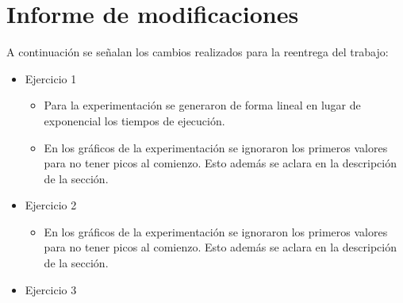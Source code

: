 \section*{Informe de modificaciones}

A continuación se señalan los cambios realizados para la reentrega del trabajo:

\begin{itemize}
	\item{
		Ejercicio 1
		\begin{itemize}
			\item Para la experimentación se generaron de forma lineal en lugar
			de exponencial los tiempos de ejecución.
			\item En los gráficos de la experimentación se ignoraron los primeros
			valores para no tener picos al comienzo. Esto además se aclara en la
			descripción de la sección.
		\end{itemize}
	}
	\item{
		Ejercicio 2
		\begin{itemize}
			\item En los gráficos de la experimentación se ignoraron los primeros
			valores para no tener picos al comienzo. Esto además se aclara en la
			descripción de la sección.
		\end{itemize}
	}
	\item{
		Ejercicio 3
	}
\end{itemize}
